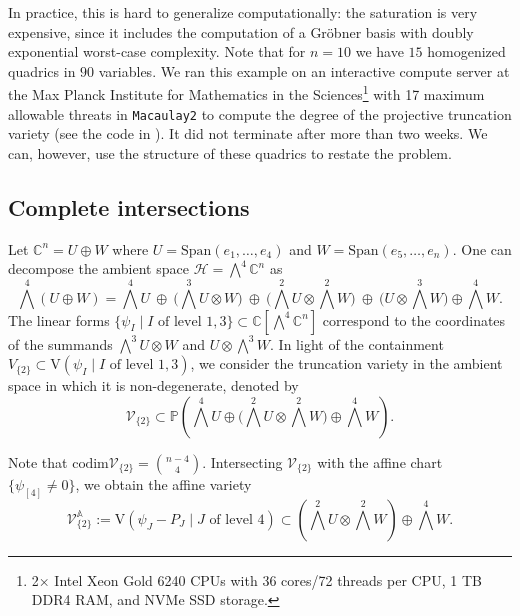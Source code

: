 \documentclass[11pt,reqno]{amsart}
\theoremstyle{definition}
\numberwithin{theorem}{section}
\newcommand{\codim}{\mathrm{codim}}
\numberwithin{equation}{section}
\begin{document}
\noindent In practice, this is hard to generalize computationally: the saturation is very expensive, since it includes the computation of a Gröbner basis with doubly exponential worst-case complexity. Note that for $n = 10$ we have $15$ homogenized quadrics in $90$ variables. We ran this example on an interactive compute server at the Max Planck Institute for Mathematics in the Sciences\footnote{2× Intel Xeon Gold 6240 CPUs with 36 cores/72 threads per CPU, 1 TB DDR4 RAM, and NVMe SSD storage.} with 17 maximum allowable threats in \texttt{Macaulay2} to compute the degree of the projective truncation variety (see the code in \cite{Faulstich2025SupplementaryCode}). It did not terminate after more than two weeks. We can, however, use the structure of these quadrics to restate the problem.

\subsection{Complete intersections}\label{sec:complete intersections}
\noindent Let $\mathbb C^n = U \oplus W$ where $U=\text{Span}(e_1,\ldots, e_4)$ and $W=\text{Span}(e_5,\ldots , e_n)$. 
One can decompose the ambient space $\mathcal{H}=\bigwedge^4\mathbb C^n$ as
\begin{equation*}
\textstyle{\bigwedge^4(U\oplus W) = \bigwedge^4U \ \oplus \ \big(\bigwedge^3U \otimes W \big)\ \oplus \ \big( \bigwedge^2U \otimes \bigwedge^2 W \big) \ \oplus \ \big( U \otimes \bigwedge^3W \big) \oplus \bigwedge^4W} .
\end{equation*}
The linear forms $\{\psi_I \mid I \text{ of level }1,3\} \subset \mathbb C[\bigwedge^4\mathbb C^n]$ correspond to the coordinates of the summands $\bigwedge^3U \otimes W$ and $U \otimes \bigwedge^3W$. In light of the containment $V_{\{2\}}\subset \textrm{V}(\psi_I \mid I \text{ of level }1,3)$, we consider the truncation variety in the ambient space in which it is non-degenerate, denoted by
\[ \mathscr{V}_{\{2\}} \subset \mathbb P\left(\textstyle{\bigwedge^4U \oplus \big( \bigwedge^2U \otimes \bigwedge^2 W \big) \oplus \bigwedge^4W}\right)  .\]

\noindent Note that ${\codim \mathscr{V}_{\{2\}} = {{n-4} \choose 4}}$. Intersecting $\mathscr{V}_{\{2\}}$ with the affine chart $\{\psi_{[4]}\neq 0\}$, we obtain the affine variety 
\begin{equation*}
\mathscr{V}_{\{2\}}^{\mathbb A} := \textrm{V}(\psi_J - P_J \mid J \textrm{ of level 4}) \subset \textstyle{\left( \bigwedge^2 U \otimes \bigwedge^2 W \right) \oplus \bigwedge^4 W}.
\end{equation*}
\end{document}
